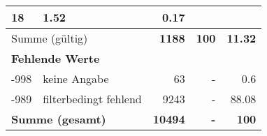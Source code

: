 \begin{longtable}{lXrrr}
       \num{18} &
       \num[round-mode=places,round-precision=2]{1.52} &
         \num[round-mode=places,round-precision=2]{0.17} \\
     \midrule
     \multicolumn{2}{l}{Summe (gültig)} &
       \textbf{\num{1188}} &
     \textbf{\num{100}} &
       \textbf{\num[round-mode=places,round-precision=2]{11.32}} \\
     \multicolumn{5}{l}{\textbf{Fehlende Werte}}\\
       -998 &
       keine Angabe &
         \num{63} &
        - &
         \num[round-mode=places,round-precision=2]{0.6} \\
       -989 &
       filterbedingt fehlend &
         \num{9243} &
        - &
         \num[round-mode=places,round-precision=2]{88.08} \\
     \midrule
     \multicolumn{2}{l}{\textbf{Summe (gesamt)}} &
          \textbf{\num{10494}} &
        \textbf{-} &
        \textbf{\num{100}} \\
     \bottomrule
     \end{longtable}
     
